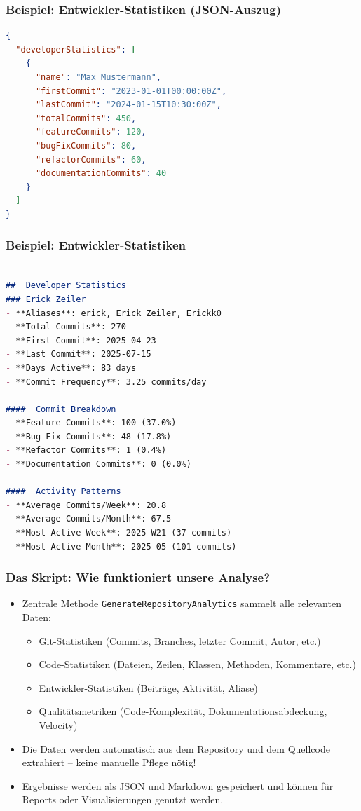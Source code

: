\documentclass{beamer}
\begin{document}
\begin{frame}[fragile]
\frametitle{Beispiel: Entwickler-Statistiken (JSON-Auszug)}
\begin{lstlisting}[language=json, basicstyle=\ttfamily\tiny, breaklines=true]
{
  "developerStatistics": [
    {
      "name": "Max Mustermann",
      "firstCommit": "2023-01-01T00:00:00Z",
      "lastCommit": "2024-01-15T10:30:00Z",
      "totalCommits": 450,
      "featureCommits": 120,
      "bugFixCommits": 80,
      "refactorCommits": 60,
      "documentationCommits": 40
    }
  ]
}
\end{lstlisting}
\end{frame}
\begin{frame}[fragile]

\frametitle{Beispiel: Entwickler-Statistiken}
\begin{lstlisting}[language=markdown,basicstyle=\ttfamily\tiny,breaklines=true]

##  Developer Statistics
### Erick Zeiler
- **Aliases**: erick, Erick Zeiler, Erickk0
- **Total Commits**: 270
- **First Commit**: 2025-04-23
- **Last Commit**: 2025-07-15
- **Days Active**: 83 days
- **Commit Frequency**: 3.25 commits/day

####  Commit Breakdown
- **Feature Commits**: 100 (37.0%)
- **Bug Fix Commits**: 48 (17.8%)
- **Refactor Commits**: 1 (0.4%)
- **Documentation Commits**: 0 (0.0%)

####  Activity Patterns
- **Average Commits/Week**: 20.8
- **Average Commits/Month**: 67.5
- **Most Active Week**: 2025-W21 (37 commits)
- **Most Active Month**: 2025-05 (101 commits)

\end{lstlisting}

\end{frame}

\begin{frame}
\frametitle{Das Skript: Wie funktioniert unsere Analyse?}
\begin{itemize}
  \item Zentrale Methode \texttt{GenerateRepositoryAnalytics} sammelt alle relevanten Daten:
  \begin{itemize}
    \item Git-Statistiken (Commits, Branches, letzter Commit, Autor, etc.)
    \item Code-Statistiken (Dateien, Zeilen, Klassen, Methoden, Kommentare, etc.)
    \item Entwickler-Statistiken (Beiträge, Aktivität, Aliase)
    \item Qualitätsmetriken (Code-Komplexität, Dokumentationsabdeckung, Velocity)
  \end{itemize}
  \item Die Daten werden automatisch aus dem Repository und dem Quellcode extrahiert – keine manuelle Pflege nötig!
  \item Ergebnisse werden als JSON und Markdown gespeichert und können für Reports oder Visualisierungen genutzt werden.
\end{itemize}
\end{frame}
\end{document}
